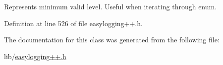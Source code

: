 Represents minimum valid level. Useful when iterating through enum. 



Definition at line 526 of file easylogging++.\+h.



The documentation for this class was generated from the following file\+:\begin{DoxyCompactItemize}
\item 
lib/\hyperlink{easylogging_09_09_8h}{easylogging++.\+h}\end{DoxyCompactItemize}
